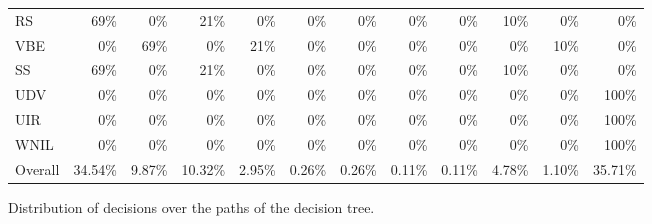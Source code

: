 \begin{figure*}
\begin{tabular}{lrrrrrrrrrrr}
RS    & \cellcolor{lightgreen}69\%   & \cellcolor{lightred}0\%   & \cellcolor{lightgreen}21\%   & \cellcolor{lightred}0\%   & \cellcolor{lightred}0\%   & \cellcolor{lightred}0\%   & \cellcolor{lightred}0\%   & \cellcolor{lightred}0\%   & \cellcolor{lightgreen}10\%   & \cellcolor{lightred}0\%   & \cellcolor{lightred}0\% \\
VBE   & \cellcolor{lightred}0\%   & \cellcolor{lightgreen}69\%   & \cellcolor{lightred}0\%   & \cellcolor{lightgreen}21\%   & \cellcolor{lightred}0\%   & \cellcolor{lightred}0\%   & \cellcolor{lightred}0\%   & \cellcolor{lightred}0\%   & \cellcolor{lightred}0\%   & \cellcolor{lightgreen}10\%   & \cellcolor{lightred}0\% \\
SS    & \cellcolor{lightgreen}69\%   & \cellcolor{lightred}0\%   & \cellcolor{lightgreen}21\%   & \cellcolor{lightred}0\%   & \cellcolor{lightred}0\%   & \cellcolor{lightred}0\%   & \cellcolor{lightred}0\%   & \cellcolor{lightred}0\%   & \cellcolor{lightgreen}10\%   & \cellcolor{lightred}0\%   & \cellcolor{lightred}0\% \\
UDV   & \cellcolor{lightred}0\%   & \cellcolor{lightred}0\%   & \cellcolor{lightred}0\%   & \cellcolor{lightred}0\%   & \cellcolor{lightred}0\%   & \cellcolor{lightred}0\%   & \cellcolor{lightred}0\%   & \cellcolor{lightred}0\%   & \cellcolor{lightred}0\%   & \cellcolor{lightred}0\%   & \cellcolor{lightgreen}100\% \\
UIR   & \cellcolor{lightred}0\%   & \cellcolor{lightred}0\%   & \cellcolor{lightred}0\%   & \cellcolor{lightred}0\%   & \cellcolor{lightred}0\%   & \cellcolor{lightred}0\%   & \cellcolor{lightred}0\%   & \cellcolor{lightred}0\%   & \cellcolor{lightred}0\%   & \cellcolor{lightred}0\%   & \cellcolor{lightgreen}100\% \\
WNIL  & \cellcolor{lightred}0\%   & \cellcolor{lightred}0\%   & \cellcolor{lightred}0\%   & \cellcolor{lightred}0\%   & \cellcolor{lightred}0\%   & \cellcolor{lightred}0\%   & \cellcolor{lightred}0\%   & \cellcolor{lightred}0\%   & \cellcolor{lightred}0\%   & \cellcolor{lightred}0\%   & \cellcolor{lightgreen}100\% \\
\midrule
Overall & \cellcolor{lightgreen}34.54\%   & \cellcolor{lightgreen}9.87\%   & \cellcolor{lightblack}10.32\%   & \cellcolor{lightblack}2.95\%   & \cellcolor{lightblue}0.26\%   & \cellcolor{lightblue}0.26\%   & \cellcolor{lightblue}0.11\%   & \cellcolor{lightblue}0.11\%   & \cellcolor{lightblack}4.78\%   & \cellcolor{lightblack}1.10\%   & \cellcolor{lightgreen}35.71\% \\
\bottomrule
\end{tabular}%
	\caption{Distribution of decisions over the paths of the decision tree.}
	\label{fig:decision-distribution}
	\label{fig:paths-sf}
\end{figure*}

